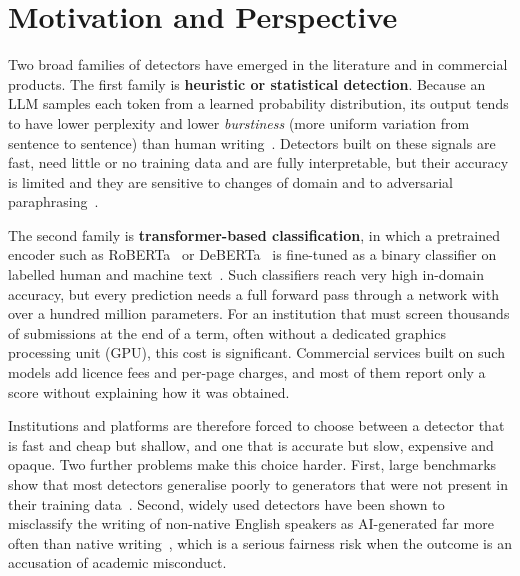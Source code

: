 \section{Motivation and Perspective}

Two broad families of detectors have emerged in the literature and in
commercial products. The first family is \textbf{heuristic or statistical
detection}. Because an LLM samples each token from a learned probability
distribution, its output tends to have lower perplexity and lower
\emph{burstiness} (more uniform variation from sentence to sentence) than
human writing~\cite{gehrmann2019gltr,mitchell2023detectgpt,hans2024binoculars}.
Detectors built on these signals are fast, need little or no training data and
are fully interpretable, but their accuracy is limited and they are sensitive
to changes of domain and to adversarial paraphrasing~\cite{krishna2023paraphrasing}.

The second family is \textbf{transformer-based classification}, in which a
pretrained encoder such as RoBERTa~\cite{liu2019roberta} or
DeBERTa~\cite{he2021deberta,he2023debertav3} is fine-tuned as a binary
classifier on labelled human and machine text~\cite{solaiman2019release,
guo2023hc3}. Such classifiers reach very high in-domain accuracy, but every
prediction needs a full forward pass through a network with over a hundred
million parameters. For an institution that must screen thousands of
submissions at the end of a term, often without a dedicated graphics processing
unit (GPU), this cost is significant. Commercial services built on such models
add licence fees and per-page charges, and most of them report only a score
without explaining how it was obtained.

Institutions and platforms are therefore forced to choose between a detector
that is fast and cheap but shallow, and one that is accurate but slow,
expensive and opaque. Two further problems make this choice harder. First,
large benchmarks show that most detectors generalise poorly to generators that
were not present in their training data~\cite{dugan2024raid,wang2024m4,
li2024mage}. Second, widely used detectors have been shown to misclassify the
writing of non-native English speakers as AI-generated far more often than
native writing~\cite{liang2023biased}, which is a serious fairness risk when
the outcome is an accusation of academic misconduct.

